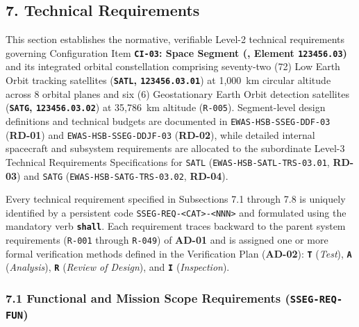 \subsection{7. Technical Requirements}

This section establishes the normative, verifiable Level-2 technical requirements governing Configuration Item \textbf{\texttt{CI-03}: Space Segment (,  Element \texttt{123456.03})} and its integrated orbital constellation comprising seventy-two (72) Low Earth Orbit tracking satellites (\textbf{\texttt{SATL},  \texttt{123456.03.01}}) at 1,000~km circular altitude across 8 orbital planes and six (6) Geostationary Earth Orbit detection satellites (\textbf{\texttt{SATG},  \texttt{123456.03.02}}) at 35,786~km altitude (\texttt{R-005}). Segment-level design definitions and technical budgets are documented in \texttt{EWAS-HSB-SSEG-DDF-03} (\textbf{RD-01}) and \texttt{EWAS-HSB-SSEG-DDJF-03} (\textbf{RD-02}), while detailed internal spacecraft and subsystem requirements are allocated to the subordinate Level-3 Technical Requirements Specifications for \texttt{SATL} (\texttt{EWAS-HSB-SATL-TRS-03.01}, \textbf{RD-03}) and \texttt{SATG} (\texttt{EWAS-HSB-SATG-TRS-03.02}, \textbf{RD-04}).

Every technical requirement specified in Subsections 7.1 through 7.8 is uniquely identified by a persistent code \texttt{SSEG-REQ-<CAT>-<NNN>} and formulated using the mandatory verb \textbf{\texttt{shall}}. Each requirement traces backward to the parent system requirements (\texttt{R-001} through \texttt{R-049}) of \textbf{AD-01} and is assigned one or more formal verification methods defined in the Verification Plan (\textbf{AD-02}): \textbf{\texttt{T}} (\emph{Test}), \textbf{\texttt{A}} (\emph{Analysis}), \textbf{\texttt{R}} (\emph{Review of Design}), and \textbf{\texttt{I}} (\emph{Inspection}).

\subsubsection{7.1 Functional and Mission Scope Requirements (\texttt{SSEG-REQ-FUN})}

